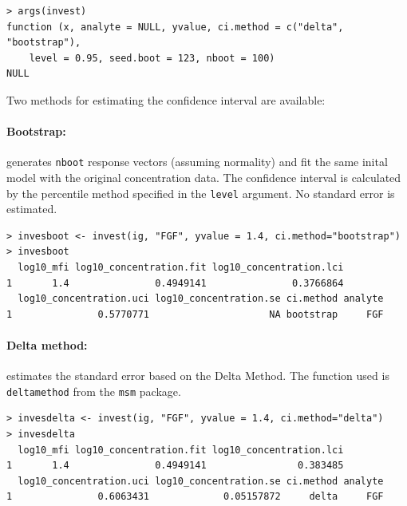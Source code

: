 \documentclass[11pt]{article}\usepackage[]{graphicx}\usepackage[]{color}
\makeatletter
\newenvironment{kframe}{%
 \def\at@end@of@kframe{}%
 \ifinner\ifhmode%
  \def\at@end@of@kframe{\end{minipage}}%
  \begin{minipage}{\columnwidth}%
 \fi\fi%
 \def\FrameCommand##1{\hskip\@totalleftmargin \hskip-\fboxsep
 \colorbox{shadecolor}{##1}\hskip-\fboxsep
     \hskip-\linewidth \hskip-\@totalleftmargin \hskip\columnwidth}%
 \MakeFramed {\advance\hsize-\width
   \@totalleftmargin\z@ \linewidth\hsize
   \@setminipage}}%
 {\par\unskip\endMakeFramed%
 \at@end@of@kframe}
\newenvironment{knitrout}{}{} %
\makeatother
\begin{document}
\begin{knitrout}
\color{fgcolor}\begin{kframe}
\begin{verbatim}
> args(invest)
function (x, analyte = NULL, yvalue, ci.method = c("delta", "bootstrap"), 
    level = 0.95, seed.boot = 123, nboot = 100) 
NULL
\end{verbatim}
\end{kframe}
\end{knitrout}


\noindent Two methods for estimating the confidence interval are available:

\paragraph{Bootstrap:} generates {\tt nboot} response vectors 
(assuming normality) and fit the same inital model with the original 
concentration data. The confidence interval is calculated by the 
percentile method specified in the {\tt level} argument. No standard error 
is estimated.

\begin{knitrout}
\color{fgcolor}\begin{kframe}
\begin{verbatim}
> invesboot <- invest(ig, "FGF", yvalue = 1.4, ci.method="bootstrap")
> invesboot
  log10_mfi log10_concentration.fit log10_concentration.lci
1       1.4               0.4949141               0.3766864
  log10_concentration.uci log10_concentration.se ci.method analyte
1               0.5770771                     NA bootstrap     FGF
\end{verbatim}
\end{kframe}
\end{knitrout}


\paragraph{Delta method:} estimates the standard error based on 
the Delta Method. The function used is {\tt deltamethod}  from the 
{\tt msm} \cite{msm} package.

\begin{knitrout}
\color{fgcolor}\begin{kframe}
\begin{verbatim}
> invesdelta <- invest(ig, "FGF", yvalue = 1.4, ci.method="delta")
> invesdelta
  log10_mfi log10_concentration.fit log10_concentration.lci
1       1.4               0.4949141                0.383485
  log10_concentration.uci log10_concentration.se ci.method analyte
1               0.6063431             0.05157872     delta     FGF
\end{verbatim}
\end{kframe}
\end{knitrout}
\end{document}
